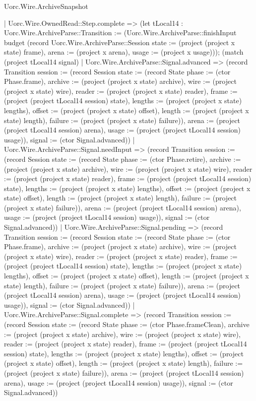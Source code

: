 \begin{lexlean}{Uorc.Wire.ArchiveSnapshot}
\begin{semanticmodule}
{    | Uorc.Wire.OwnedRead::Step.complete => (let tLocal14 : Uorc.Wire.ArchiveParse::Transition := (Uorc.Wire.ArchiveParse::finishInput budget (record Uorc.Wire.ArchiveParse::Session {state := (project (project x state) frame), arena := (project x arena), usage := (project x usage)})); (match (project tLocal14 signal)
      | Uorc.Wire.ArchiveParse::Signal.advanced => (record Transition {session := (record Session {state := (record State {phase := (ctor Phase.frame), archive := (project (project x state) archive), wire := (project (project x state) wire), reader := (project (project x state) reader), frame := (project (project tLocal14 session) state), lengths := (project (project x state) lengths), offset := (project (project x state) offset), length := (project (project x state) length), failure := (project (project x state) failure)}), arena := (project (project tLocal14 session) arena), usage := (project (project tLocal14 session) usage)}), signal := (ctor Signal.advanced)})
      | Uorc.Wire.ArchiveParse::Signal.needInput => (record Transition {session := (record Session {state := (record State {phase := (ctor Phase.retire), archive := (project (project x state) archive), wire := (project (project x state) wire), reader := (project (project x state) reader), frame := (project (project tLocal14 session) state), lengths := (project (project x state) lengths), offset := (project (project x state) offset), length := (project (project x state) length), failure := (project (project x state) failure)}), arena := (project (project tLocal14 session) arena), usage := (project (project tLocal14 session) usage)}), signal := (ctor Signal.advanced)})
      | Uorc.Wire.ArchiveParse::Signal.pending => (record Transition {session := (record Session {state := (record State {phase := (ctor Phase.frame), archive := (project (project x state) archive), wire := (project (project x state) wire), reader := (project (project x state) reader), frame := (project (project tLocal14 session) state), lengths := (project (project x state) lengths), offset := (project (project x state) offset), length := (project (project x state) length), failure := (project (project x state) failure)}), arena := (project (project tLocal14 session) arena), usage := (project (project tLocal14 session) usage)}), signal := (ctor Signal.advanced)})
      | Uorc.Wire.ArchiveParse::Signal.complete => (record Transition {session := (record Session {state := (record State {phase := (ctor Phase.frameClean), archive := (project (project x state) archive), wire := (project (project x state) wire), reader := (project (project x state) reader), frame := (project (project tLocal14 session) state), lengths := (project (project x state) lengths), offset := (project (project x state) offset), length := (project (project x state) length), failure := (project (project x state) failure)}), arena := (project (project tLocal14 session) arena), usage := (project (project tLocal14 session) usage)}), signal := (ctor Signal.advanced)})
}
\end{semanticmodule}
\end{lexlean}
